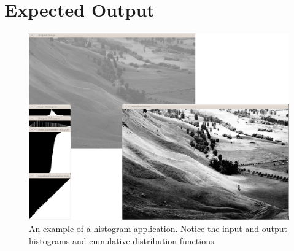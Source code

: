 \documentclass[12pt]{article}
\begin{document}
\newpage
\section*{Expected Output}

\begin{figure}[h]
    \centering
    \includegraphics[width=1.0\textwidth]{hist_eq}
    \caption{An example of a histogram application. Notice the input and output histograms and cumulative distribution functions.}
    \label{fig:histogram_app}
\end{figure}
\end{document}

